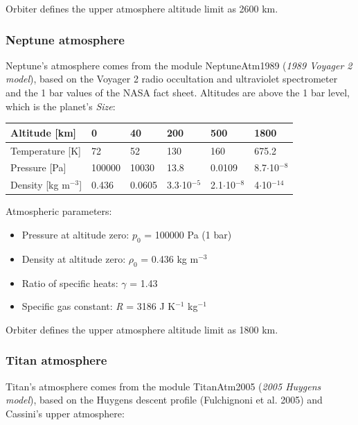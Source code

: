 \documentclass[Orbiter Developer Manual.tex]{subfiles}
\begin{document}
\noindent
Orbiter defines the upper atmosphere altitude limit as 2600 km.


\subsubsection{Neptune atmosphere}
Neptune's atmosphere comes from the module NeptuneAtm1989 (\textit{1989 Voyager 2 model}), based on the Voyager 2 radio occultation and ultraviolet spectrometer and the 1 bar values of the NASA fact sheet. Altitudes are above the 1 bar level, which is the planet's \textit{Size}:

	\begin{longtable}{ |p{}|p{}|p{}|p{}|p{}|p{}| }
	\hline\rule{0pt}{2ex}
	Altitude [km] & 0 & 40 & 200 & 500 & 1800\\
	\hline\rule{0pt}{2ex}
	Temperature [K] & 72 & 52 & 130 & 160 & 675.2\\
	\hline\rule{0pt}{2ex}
	Pressure [Pa] & 100000 & 10030 & 13.8 & 0.0109 & 8.7$\cdot$10$^{-8}$\\
	\hline\rule{0pt}{2ex}
	Density [kg m$^{-3}$] & 0.436 & 0.0605 & 3.3$\cdot$10$^{-5}$ & 2.1$\cdot$10$^{-8}$ & 4$\cdot$10$^{-14}$\\
	\hline
	\end{longtable}

\noindent
Atmospheric parameters:

\begin{itemize}
\item Pressure at altitude zero: $p_{0}$ = 100000 Pa (1 bar)
\item Density at altitude zero: $\rho_{0}$ = 0.436 kg m$^{-3}$
\item Ratio of specific heats: $\gamma$ = 1.43
\item Specific gas constant: \textit{R} = 3186 J K$^{-1}$ kg$^{-1}$
\end{itemize}

\noindent
Orbiter defines the upper atmosphere altitude limit as 1800 km.


\subsubsection{Titan atmosphere}
Titan's atmosphere comes from the module TitanAtm2005 (\textit{2005 Huygens model}), based on the Huygens descent profile (Fulchignoni et al. 2005) and Cassini's upper atmosphere:
\end{document}
